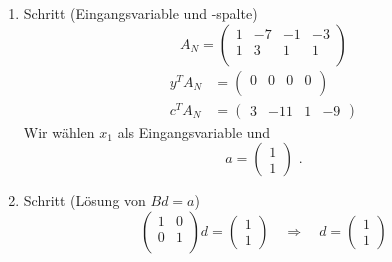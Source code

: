 \documentclass[a4paper]{scrartcl}
\begin{document}
\begin{enumerate}[label=\bfseries\arabic*.]
\begin{enumerate}[1.]
\begin{enumerate}[1.]
                    \item Schritt (Eingangsvariable und -spalte)
                        \begin{equation}
                            A_N =
                            \begin{pmatrix}
                                1 & -7 & -1 & -3 \\
                                1 &  3 &  1 &  1 \\
                            \end{pmatrix}
                        \end{equation}
                        \begin{align}
                            y^TA_N &=
                            \begin{pmatrix}
                                0 & 0 & 0 & 0 \\
                            \end{pmatrix} \\
                            c^TA_N &=
                            \begin{pmatrix}
                                3 & -11 & 1 & -9
                            \end{pmatrix}
                        \end{align}
                        Wir wählen $x_1$ als Eingangsvariable und
                        \begin{equation}
                            a =
                            \begin{pmatrix}
                                1 \\ 1
                            \end{pmatrix}
                            \text{ .}   
                        \end{equation}

                    \item Schritt (Lösung von $Bd = a$)
                        \begin{equation}
                            \begin{pmatrix}
                                1 & 0 \\
                                0 & 1 \\
                            \end{pmatrix}
                            d
                            =
                            \begin{pmatrix}
                                1 \\ 1
                            \end{pmatrix}
                            \quad\Rightarrow\quad
                            d =
                            \begin{pmatrix}
                                1 \\ 1
                            \end{pmatrix}
                        \end{equation}


\end{enumerate}
\end{enumerate}
\end{enumerate}
\end{document}

